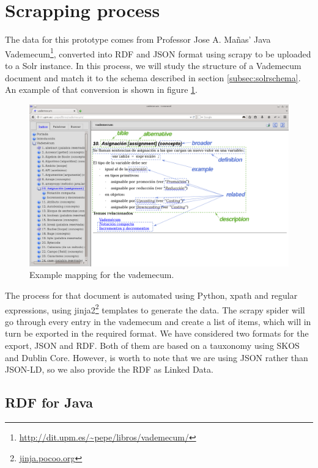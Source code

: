 \section{Scrapping process}
\label{sec:javascrapping}

The data for this prototype comes from Professor Jose A. Mañas' Java Vademecum\footnote{\url{http://dit.upm.es/~pepe/libros/vademecum/}}, converted into RDF and JSON format using scrapy to be uploaded to a Solr instance. In this process, we will study the structure of a Vademecum document and match it to the schema described in section \ref{subsec:solrschema}. An example of that conversion is shown in figure \ref{fig:vademecum1}.

\begin{figure}[!htbp]
    \centering
    \includegraphics[width=1.1\textwidth]{img/screens/vademecum-ex.png}
    \caption{Example mapping for the vademecum.}
    \label{fig:vademecum1}
\end{figure}

The process for that document is automated using Python, xpath and regular expressions, using jinja2\footnote{\url{jinja.pocoo.org}} templates to generate the data. The scrapy spider will go through every entry in the vademecum and create a list of items, which will in turn be exported in the required format. We have considered two formats for the export, JSON and RDF. Both of them are based on a tauxonomy using SKOS and Dublin Core. However, is worth to note that we are using JSON rather than JSON-LD, so we also provide the RDF as Linked Data.

\subsection{RDF for Java}


